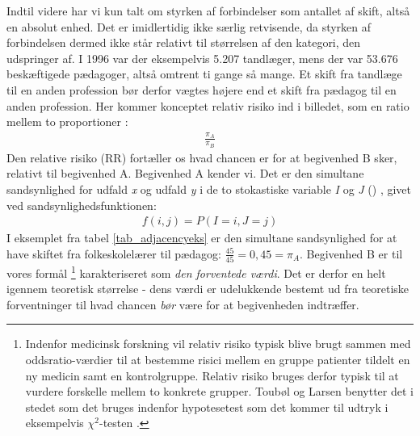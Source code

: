 Indtil videre har vi kun talt om styrken af forbindelser som antallet af skift, altså en absolut enhed. Det er imidlertidig ikke særlig retvisende, da styrken af forbindelsen dermed ikke står relativt til størrelsen af den kategori, den udspringer af. I 1996 var der eksempelvis 5.207 tandlæger, mens der var 53.676 beskæftigede pædagoger, altså omtrent ti gange så mange. Et skift fra tandlæge til en anden profession bør derfor vægtes højere end et skift fra pædagog til en anden profession.  Her kommer konceptet relativ risiko ind i billedet, som en ratio mellem to proportioner \parencite[244, 271]{Agresti1997}: 
%
\begin{align} 
\frac{\pi_{A}}{\pi_{B}}
\end{align} 
%
Den relative risiko (RR) fortæller os hvad chancen er for at begivenhed B sker, relativt til begivenhed A. Begivenhed A kender vi. Det er den simultane sandsynlighed for udfald \emph{x} og udfald \emph{y} i de to stokastiske variable \emph{I} og \emph{J} () \parencite[41]{Malchow-Moeller2003}, givet ved sandsynlighedsfunktionen:
%
\begin{align} 
f(i,j) = P(I=i, J=j)
\end{align} 
%
I eksemplet fra tabel \ref{tab_adjacencyeks} er den simultane sandsynlighed for at have skiftet fra folkeskolelærer til pædagog: $\frac{45}{45} = 0,45 = \pi_{A}$. Begivenhed B er til vores formål%
%
\footnote{Indenfor medicinsk forskning vil relativ risiko typisk blive brugt sammen med oddsratio-værdier til at bestemme risici mellem en gruppe patienter tildelt en ny medicin samt en kontrolgruppe. Relativ risiko bruges derfor typisk til at vurdere forskelle mellem to konkrete grupper. Toubøl og Larsen benytter det i stedet som det bruges indenfor hypotesetest som det kommer til udtryk i eksempelvis $\chi^{2}$-testen \parencite[205]{Malchow-Moeller2003}.}%
%
 karakteriseret som \emph{den forventede værdi}. Det er derfor en helt igennem teoretisk størrelse - dens værdi er udelukkende bestemt ud fra teoretiske forventninger til hvad chancen \emph{bør} være for at begivenheden indtræffer.  

